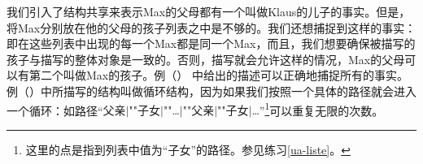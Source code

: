 我们引入了结构共享来表示Max的父母都有一个叫做Klaus的儿子的事实。但是，将Max分别放在他的父母的孩子列表之中是不够的。我们还想捕捉到这样的事实：即在这些列表中出现的每一个Max都是同一个Max，而且，我们想要确保被描写的孩子与描写的整体对象是一致的。否则，描写就会允许这样的情况，Max的父母可以有第二个叫做Max的孩子。例（）
中给出的描述可以正确地捕捉所有的事实。
\ea
\label{bsp-avm-zyklen}
 
\z
例（）中所描写的结构叫做循环结构，因为如果我们按照一个具体的路径就会进入一个循环：如路径“\textsc{父亲$|$""子女$|$""\ldots$|$""父亲$|$""子女$|$\ldots}”\footnote{%
这里的点是指到列表中值为“\textsc{子女}”的路径。参见练习\ref{ua-liste}。
}可以重复无限的次数。

